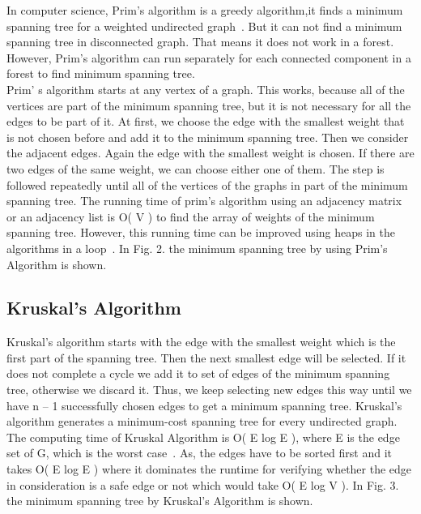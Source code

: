 \documentclass[conference,column]{IEEEtran}
\begin{document}
In computer science, Prim's algorithm is a greedy algorithm,it finds a minimum spanning tree for a weighted undirected graph~\cite{primwiki}. But it can not find a minimum spanning tree in disconnected  graph. That means it does not work in a forest. However, Prim’s algorithm can run separately for each connected component in a forest to find minimum spanning tree.\\Prim’ s algorithm starts at any vertex of a graph. This works, because all of the vertices are part of the minimum spanning tree, but it is not necessary for all the edges to be part of it. At first, we choose the edge with the smallest weight that is not chosen before and add it to the minimum spanning tree. Then we consider the adjacent edges. Again the edge with the smallest weight is chosen. If there are two edges of the same weight, we can choose either one of them. The step is followed repeatedly until all of the vertices of the graphs in part of the minimum spanning tree. The running time of prim’s algorithm using an adjacency matrix or an adjacency list is O( \textbar V ) to find the array of weights of the minimum spanning tree. However, this running time can be improved using heaps in the algorithms in a loop~\cite{primwiki}.
In Fig. 2. the minimum spanning tree by using Prim's Algorithm is shown.





\subsection{Kruskal's Algorithm}
Kruskal’s algorithm  starts with  the edge with the smallest weight which is the first part of the spanning tree. Then the next smallest edge will be selected. If it does not complete a cycle we add it to set of edges of the minimum spanning tree, otherwise we discard it. Thus, we keep selecting new edges this way until we
have n – 1 successfully chosen edges to get a minimum spanning tree. Kruskal’s algorithm generates a minimum-cost spanning tree for every undirected graph.\\The computing time of  Kruskal Algorithm is O( \textbar E \textbar log \textbar E \textbar ), where E is the edge set of G, which is the worst case~\cite{bookalgo}. As, the edges have to be sorted first and it takes O( \textbar E \textbar log \textbar E \textbar ) where it dominates the runtime for verifying whether the edge in consideration is a safe edge or not which would take O( \textbar E \textbar log \textbar V \textbar).
In Fig. 3. the minimum spanning tree by Kruskal's Algorithm is shown.
\end{document}
